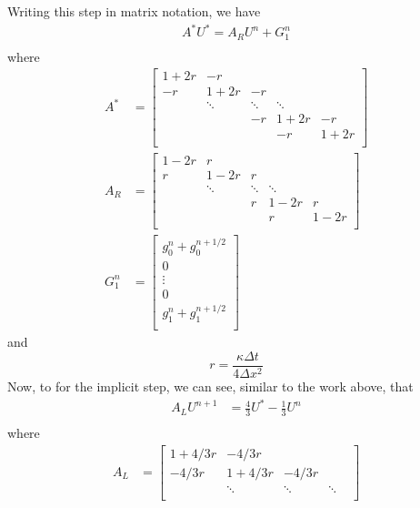 \documentclass{article}
\begin{document}
\begin{itemize}
    Writing this step in matrix notation, we have
    \begin{align*}
        A^*U^* = A_RU^n + G^n_1\\
    \end{align*}
    where 
    \begin{align*}
        A^* &= \begin{bmatrix}
         1 + 2r & -r & & & \\
         -r & 1 + 2r & -r & & \\
           & \ddots & \ddots & \ddots & \\
           & & -r & 1 + 2r & -r \\
           & & & -r & 1 + 2r \\
        \end{bmatrix} \\
        A_R &= \begin{bmatrix}
         1 - 2r & r & & & \\
         r & 1 - 2r & r & & \\
           & \ddots & \ddots & \ddots & \\
           & & r & 1 - 2r & r \\
           & & & r & 1 - 2r \\
        \end{bmatrix}\\
        G^n_1 &= \begin{bmatrix}
            g_0^n + g_0^{n+1/2} \\
            0\\
            \vdots\\
            0\\
            g_1^n + g_1^{n+1/2}\\
        \end{bmatrix}
    \end{align*}
    and
    \[r = \frac{\kappa\Delta t}{4\Delta x^2}\]
    Now, to for the implicit step, we can see, similar to the work above, that 
    \begin{align*}
        A_LU^{n+1} &= \frac{4}{3}U^* -\frac{1}{3}U^n\\
    \end{align*}
    where 
    \begin{align*}
        A_L &= \begin{bmatrix}
            1 + 4/3r & -4/3r & & & \\
            -4/3r & 1 + 4/3r & -4/3r & & \\
            & \ddots & \ddots & \ddots & \\

\end{bmatrix}
\end{align*}
\end{itemize}
\end{document}
